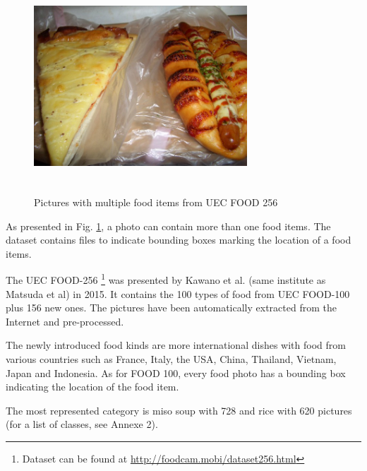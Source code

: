\begin{figure}[h]
    \includegraphics[width=8cm, height=8cm]{img/multiple_food_items_4}
    \caption{Pictures with multiple food items from UEC FOOD 256}
    \label{fig:presentation_multiple_food_items}
\end{figure}

As presented in Fig. \ref{fig:presentation_multiple_food_items}, a photo can contain more than one food items. The dataset contains files to indicate bounding boxes marking the location of a food items.

The UEC FOOD-256 \footnote{Dataset can be found at \url{http://foodcam.mobi/dataset256.html}} was presented by Kawano et al. (same institute as Matsuda et al) in 2015. It contains the 100 types of food from UEC FOOD-100 plus 156 new ones. The pictures have been automatically extracted from the Internet and pre-processed. 

The newly introduced food kinds are more international dishes with food from various countries such as France, Italy, the USA, China, Thailand, Vietnam, Japan and Indonesia. As for FOOD 100, every food photo has a bounding box indicating the location of the food item.

The most represented category is miso soup with 728 and rice with 620 pictures (for a list of classes, see Annexe 2).